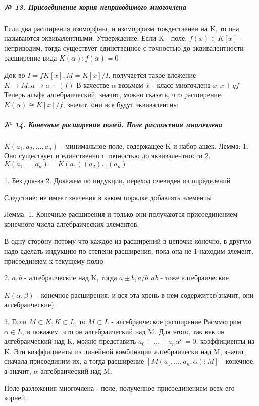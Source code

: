 \documentclass{article}
\begin{document}
\subparagraph{\tiny № 13. Присоединение корня неприводимого многочлена}

\begin{flushleft}

Если два расширения изоморфны, и изоморфизм тождественен на K, то она называются эквивалентными.
Утверждение:
Если K - поле, $f(x) \in K[x]$ - неприводим, тогда существует единственное с точностью до эквивалентности расширение вида $K(\alpha) : f(\alpha) = 0$

Док-во $I = fK[x], M = K[x] / I$, получается такое вложение $K \rightarrow M, a \rightarrow a + (f)$
В качестве $\alpha$ возьмем $\overline{x}$ - класс многочлена $x : x + qf$
Теперь альфа алгебраический, значит, можно сказать, что расширение $K(\alpha) \cong K[x] / f$, значит, они все будут эквивалентны

\end{flushleft}


\subparagraph{\tiny № 14. Конечные расширения полей. Поле разложения многочлена}

\begin{flushleft}

$K(a_1, a_2, ..., a_n)$ - минимальное поле, содержащее K и набор ашек.
Лемма:
1. Оно существует и единственно с точностью до эквивалентности
2. $K(a_1, ..., a_n) = K(a_1) (a_2)... (a_n)$

1. Без док-ва
2. Докажем по индукции, переход очевиден из определений

Следствие: не имеет значения в каком порядке добавлять элементы

Лемма:
1. Конечные расширения и только они получаются присоединением конечного числа алгебраических элементов.

В одну сторону потому что каждое из расширений в цепочке конечно, в другую надо сделать индукцию по степени расширения, пока она не 1 находим элемент, присоединяем к текущему полю

2. $a, b$ - алгебраические над K, тогда $a\pm b, a/b, ab$ - тоже алгебраические

$K(\alpha, \beta)$ - конечное расширения, и вся эта хрень в нем содержится(значит, они алгебраические)

3. Если $M \subset K, K \subset L$, то $M \subset L$ - алгебраическое расширение
Расммотрим $\alpha \in L$, и покажем, что он алгебраический над M.
Для этого, так как он алгебраический над K, можно представить $a_0 + ... + a_n \alpha^n = 0$, коэффициенты из K. Эти коэффициенты из линейной комбинации алгебраически над M, значит, сначала присоединим их, а тогда расширение $[M(a_1, ..., a_n, \alpha) : M]$ - конечное, а значит, $\alpha$ алгебраический над M.

Поле разложения многочлена - поле, полученное присоединением всех его корней.

\end{flushleft}
\end{document}
